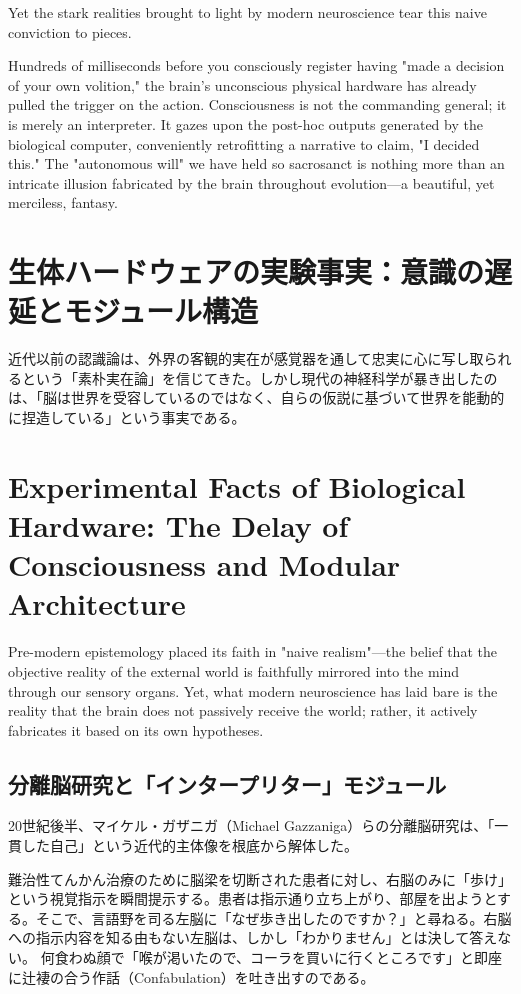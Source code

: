     Yet the stark realities brought to light by modern neuroscience tear this naive conviction to pieces.

    Hundreds of milliseconds before you consciously register having "made a decision of your own volition," the brain's unconscious physical hardware has already pulled the trigger on the action. Consciousness is not the commanding general; it is merely an interpreter. It gazes upon the post-hoc outputs generated by the biological computer, conveniently retrofitting a narrative to claim, "I decided this." The "autonomous will" we have held so sacrosanct is nothing more than an intricate illusion fabricated by the brain throughout evolution—a beautiful, yet merciless, fantasy.
\fi

\ifja
    \section{生体ハードウェアの実験事実：意識の遅延とモジュール構造}
    近代以前の認識論は、外界の客観的実在が感覚器を通して忠実に心に写し取られるという「素朴実在論」を信じてきた。しかし現代の神経科学が暴き出したのは、「脳は世界を受容しているのではなく、自らの仮説に基づいて世界を能動的に捏造している」という事実である。
\else
    \section{Experimental Facts of Biological Hardware: The Delay of Consciousness and Modular Architecture}
    Pre-modern epistemology placed its faith in "naive realism"—the belief that the objective reality of the external world is faithfully mirrored into the mind through our sensory organs. Yet, what modern neuroscience has laid bare is the reality that the brain does not passively receive the world; rather, it actively fabricates it based on its own hypotheses.
\fi

\ifja
    \subsection{分離脳研究と「インタープリター」モジュール}
    20世紀後半、マイケル・ガザニガ（Michael Gazzaniga）らの分離脳研究は、「一貫した自己」という近代的主体像を根底から解体した。

    難治性てんかん治療のために脳梁を切断された患者に対し、右脳のみに「歩け」という視覚指示を瞬間提示する。患者は指示通り立ち上がり、部屋を出ようとする。そこで、言語野を司る左脳に「なぜ歩き出したのですか？」と尋ねる。右脳への指示内容を知る由もない左脳は、しかし「わかりません」とは決して答えない。
    何食わぬ顔で「喉が渇いたので、コーラを買いに行くところです」と即座に辻褄の合う作話（Confabulation）を吐き出すのである。

